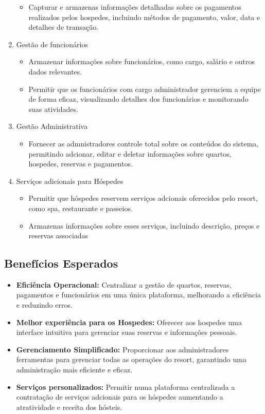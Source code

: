 \begin{enumerate}
\begin{itemize}
        \item Capturar e armazenas informações detalhadas sobre os pagamentos realizados pelos hospedes, incluindo métodos de pagamento, valor, data e detalhes de transação.
    \end{itemize}
    \item Gestão de funcionários
    \begin{itemize}
        \item Armazenar informações sobre funcionários, como cargo, salário e outros dados relevantes.
        \item Permitir que os funcionários com cargo administrador gerenciem a equipe de forma eficaz, visualizando detalhes dos funcionários e monitorando suas atividades.
    \end{itemize}
    \item Gestão Administrativa
    \begin{itemize}
        \item Fornecer as admnistradores controle total sobre os conteúdos do sistema, permitindo adcionar, editar e deletar informações sobre quartos, hospedes, reservas e pagamentos.
    \end{itemize}
    \item Serviços adicionais para Hóspedes
    \begin{itemize}
        \item Permitir que hóspedes reservem serviços adcionais oferecidos pelo resort, como spa, restaurante e passeios.
        \item Armazenas informações sobre esses serviços, incluindo descrição, preços e reservas associadas
    \end{itemize}
\end{enumerate}

\subsection{Benefícios Esperados}
\begin{itemize}
    \item \textbf{Eficiência Operacional:} Centralizar a gestão de quartos, reservas, pagamentos e funcionários em uma única plataforma, melhorando a eficiência e reduzindo erros.
    \item \textbf{Melhor experiência para os Hospedes:} Oferecer aos hospedes uma interface intuitiva para gerenciar suas reservas e informações pessoais.
    \item \textbf{Gerenciamento Simplificado:} Proporcionar aos administradores ferramentas para gerenciar todas as operações do resort, garantindo uma administração mais eficiente e eficaz.
    \item \textbf{Serviços personalizados:} Permitir numa plataforma centralizada a contratação de serviços adcionais para os hóspedes aumentando a atratividade e receita dos hósteis.
\end{itemize}

